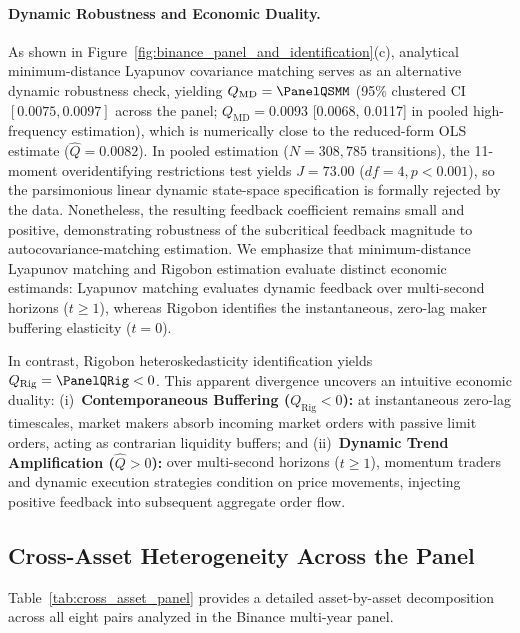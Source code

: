 \documentclass[12pt]{article}
\theoremstyle{definition}
\theoremstyle{remark}
\begin{document}
\paragraph{Dynamic Robustness and Economic Duality.}
As shown in Figure~\ref{fig:binance_panel_and_identification}(c), analytical minimum-distance Lyapunov covariance matching serves as an alternative dynamic robustness check, yielding $Q_{\text{MD}} = \PanelQSMM$ (95\% clustered CI $[0.0075, 0.0097]$ across the panel; $Q_{\text{MD}} = 0.0093$ [0.0068, 0.0117] in pooled high-frequency estimation), which is numerically close to the reduced-form OLS estimate ($\hat{Q} = 0.0082$). In pooled estimation ($N = 308{,}785$ transitions), the 11-moment overidentifying restrictions test yields $J = 73.00$ ($df = 4, p < 0.001$), so the parsimonious linear dynamic state-space specification is formally rejected by the data. Nonetheless, the resulting feedback coefficient remains small and positive, demonstrating robustness of the subcritical feedback magnitude to autocovariance-matching estimation. We emphasize that minimum-distance Lyapunov matching and Rigobon estimation evaluate distinct economic estimands: Lyapunov matching evaluates dynamic feedback over multi-second horizons ($t \ge 1$), whereas Rigobon identifies the instantaneous, zero-lag maker buffering elasticity ($t = 0$).

In contrast, Rigobon heteroskedasticity identification yields $Q_{\text{Rig}} = \PanelQRig < 0$. This apparent divergence uncovers an intuitive economic duality: (i)~\textbf{Contemporaneous Buffering ($Q_{\text{Rig}} < 0$):} at instantaneous zero-lag timescales, market makers absorb incoming market orders with passive limit orders, acting as contrarian liquidity buffers; and (ii)~\textbf{Dynamic Trend Amplification ($\hat{Q} > 0$):} over multi-second horizons ($t \ge 1$), momentum traders and dynamic execution strategies condition on price movements, injecting positive feedback into subsequent aggregate order flow.

\subsection{Cross-Asset Heterogeneity Across the Panel}
Table~\ref{tab:cross_asset_panel} provides a detailed asset-by-asset decomposition across all eight pairs analyzed in the Binance multi-year panel.
\end{document}

